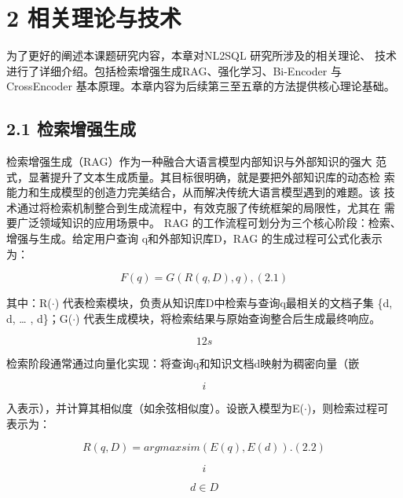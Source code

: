 \documentclass[12pt,a4paper,openright,UTF8]{ctexbook}
\begin{document}
\chapter{2 相关理论与技术}

为了更好的阐述本课题研究内容，本章对NL2SQL 研究所涉及的相关理论、 技术进行了详细介绍。包括检索增强生成RAG、强化学习、Bi-Encoder 与CrossEncoder 基本原理。本章内容为后续第三至五章的方法提供核心理论基础。

\section{2.1 检索增强生成}

检索增强生成（RAG）作为一种融合大语言模型内部知识与外部知识的强大 范式，显著提升了文本生成质量。其目标很明确，就是要把外部知识库的动态检 索能力和生成模型的创造力完美结合，从而解决传统大语言模型遇到的难题。该 技术通过将检索机制整合到生成流程中，有效克服了传统框架的局限性，尤其在 需要广泛领域知识的应用场景中。 RAG 的工作流程可划分为三个核心阶段：检索、增强与生成。给定用户查询 q和外部知识库D，RAG 的生成过程可公式化表示为：

\begin{equation*}
F(q) = G(R(q, D), q),(2.1)
\end{equation*}

其中：R($\cdot$) 代表检索模块，负责从知识库D中检索与查询q最相关的文档子集 \{d, d, … , d\}；G($\cdot$) 代表生成模块，将检索结果与原始查询整合后生成最终响应。

\begin{equation*}
12s
\end{equation*}

检索阶段通常通过向量化实现：将查询q和知识文档d映射为稠密向量（嵌

\begin{equation*}
i
\end{equation*}

入表示），并计算其相似度（如余弦相似度）。设嵌入模型为E($\cdot$)，则检索过程可 表示为：

\begin{equation*}
R(q, D) = arg maxsim(E(q), E(d)).(2.2)
\end{equation*}

\begin{equation*}
i
\end{equation*}

\begin{equation*}
d\in D
\end{equation*}
\end{document}
